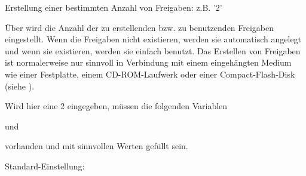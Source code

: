 \begin{description}

    Erstellung einer bestimmten Anzahl von Freigaben: z.B. '2'

        Über  wird die Anzahl der zu erstellenden bzw. zu
        benutzenden Freigaben eingestellt. Wenn die Freigaben nicht existieren,
        werden sie automatisch angelegt und wenn sie existieren, werden sie
        einfach benutzt.
        Das Erstellen von Freigaben ist normalerweise nur sinnvoll in Verbindung
        mit einem eingehängten Medium wie einer Festplatte, einem CD-ROM-Laufwerk
        oder einer Compact-Flash-Disk (siehe ).

        Wird hier eine 2 eingegeben, müssen die folgenden Variablen







        und







        vorhanden und mit sinnvollen Werten gefüllt sein.

        Standard-Einstellung: 

\end{description}


